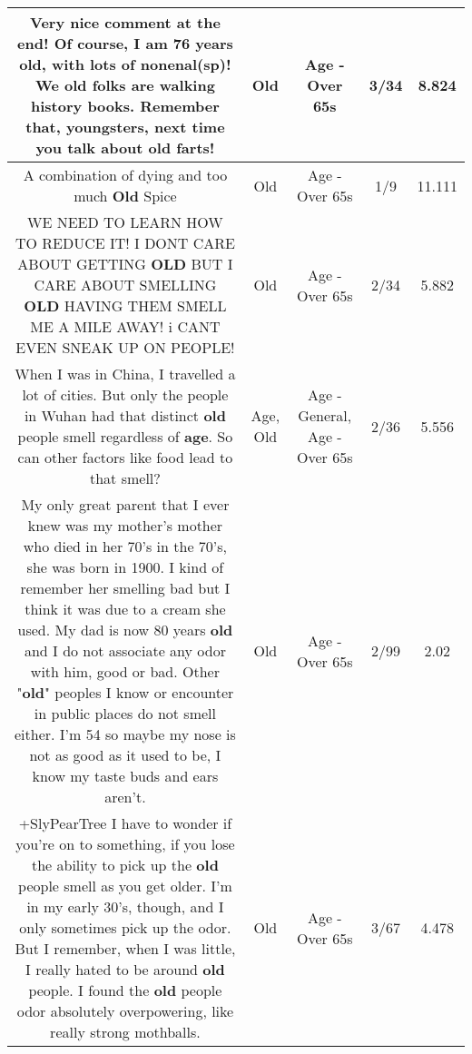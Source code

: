 \documentclass[11pt]{article}
\newlength\mylength
\begin{document}
\begin{center}
\begin{longtable}{|C{.65\mylength}|C{.30\mylength}|C{.12\mylength}|C{.12\mylength}|C{.12\mylength}|}
  \small Very nice comment at the end!  Of course, I am 76 years \textbf{old}, with lots of nonenal(sp)!   We \textbf{old} folks are walking history books.  Remember that, youngsters, next time you talk about \textbf{old} farts!\normalsize   & Old & Age - Over 65s & 3/34 & 8.824 \\  \hline
  \small A combination of dying and too much \textbf{Old} Spice\normalsize   & Old & Age - Over 65s & 1/9 & 11.111 \\  \hline
  \small WE NEED TO LEARN HOW TO REDUCE IT! I DONT CARE ABOUT GETTING \textbf{OLD} BUT I CARE ABOUT SMELLING \textbf{OLD} HAVING THEM SMELL ME A MILE AWAY! i CANT EVEN SNEAK UP ON PEOPLE!\normalsize   & Old & Age - Over 65s & 2/34 & 5.882 \\  \hline
  \small When I was in China, I travelled a lot of cities. But only the people in Wuhan had that distinct \textbf{old} people smell regardless of \textbf{age}. So can other factors like food lead to that smell?\normalsize   & Age, Old & Age - General, Age - Over 65s & 2/36 & 5.556 \\  \hline
  \small My only great parent that I ever knew was my mother's mother who died in her 70's in the 70's, she was born in 1900. I kind of remember her smelling bad but I think it was due to a cream she used. My dad is now 80 years \textbf{old} and I do not associate any odor with him, good or bad. Other "\textbf{old}" peoples I know or encounter in public places do not smell either. I'm 54 so maybe my nose is not as good as it used to be, I know my taste buds and ears aren't.\normalsize   & Old & Age - Over 65s & 2/99 & 2.02 \\  \hline
  \small +SlyPearTree I have to wonder if you're on to something, if you lose the ability to pick up the \textbf{old} people smell as you get older.  I'm in my early 30's, though, and I only sometimes pick up the odor.  But I remember, when I was little, I really hated to be around \textbf{old} people.  I found the \textbf{old} people odor absolutely overpowering, like really strong mothballs.\normalsize   & Old & Age - Over 65s & 3/67 & 4.478 \\  \hline

\end{longtable}
\end{center}
\end{document}
